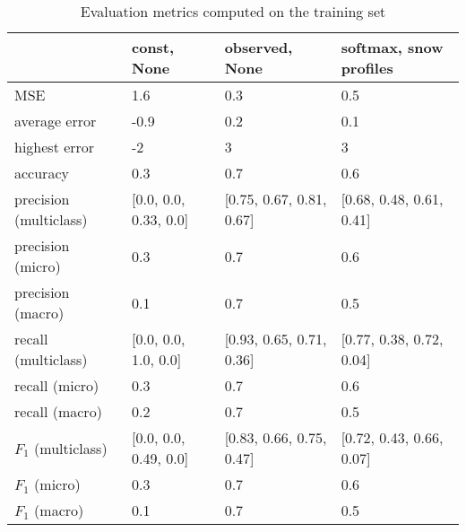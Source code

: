 \begin{table}[H]
\caption{Evaluation metrics computed on the training set}
\label{tbl:sais_eval_training}
\begin{tabular}{llll}
\toprule
 & const, None & observed, None & softmax, snow profiles \\
\midrule
MSE & 1.6 & 0.3 & 0.5 \\
average error & -0.9 & 0.2 & 0.1 \\
highest error & -2 & 3 & 3 \\
accuracy & 0.3 & 0.7 & 0.6 \\
precision (multiclass) & [0.0, 0.0, 0.33, 0.0] & [0.75, 0.67, 0.81, 0.67] & [0.68, 0.48, 0.61, 0.41] \\
precision (micro) & 0.3 & 0.7 & 0.6 \\
precision (macro) & 0.1 & 0.7 & 0.5 \\
recall (multiclass) & [0.0, 0.0, 1.0, 0.0] & [0.93, 0.65, 0.71, 0.36] & [0.77, 0.38, 0.72, 0.04] \\
recall (micro) & 0.3 & 0.7 & 0.6 \\
recall (macro) & 0.2 & 0.7 & 0.5 \\
$F_1$ (multiclass) & [0.0, 0.0, 0.49, 0.0] & [0.83, 0.66, 0.75, 0.47] & [0.72, 0.43, 0.66, 0.07] \\
$F_1$ (micro) & 0.3 & 0.7 & 0.6 \\
$F_1$ (macro) & 0.1 & 0.7 & 0.5 \\
\bottomrule
\end{tabular}
\end{table}
